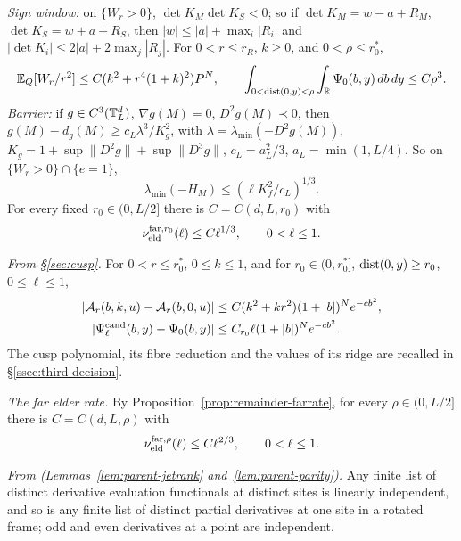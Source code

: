 \emph{Sign window:} on $\{W_r>0\}$, $\det K_M\det K_S<0$; so if $\det K_M=w-a+R_M$, $\det K_S=w+a+R_S$, then $|w|\le|a|+\max_i|R_i|$ and $|\det K_i|\le2|a|+2\max_j|R_j|$. For $0<r\le r_R$, $k\ge0$, and $0<\rho\le r_0^*$,
\begin{equation}\label{eq:third-W1}
\mathbb E_Q[W_r/r^2]\le C(k^2+r^4(1+k)^2)P^N,\qquad \int_{0<\operatorname{dist}(0,y)<\rho}\int_\mathbb R\Psi_0(b,y)\,db\,dy\le C\rho^3.
\end{equation}
\emph{Barrier:} if $g\in C^3(\mathbb T^d_L)$, $\nabla g(M)=0$, $D^2g(M)\prec0$, then $g(M)-d_g(M)\ge c_L\lambda^3/K_g^2$, with $\lambda=\lambda_{\min}(-D^2g(M))$, $K_g=1+\sup\|D^2g\|+\sup\|D^3g\|$, $c_L=a_L^2/3$, $a_L=\min(1,L/4)$. So on $\{W_r>0\}\cap\{e=1\}$,
\begin{equation}\label{eq:third-barrier}
\lambda_{\min}(-H_M)\le(\ell K_f^2/c_L)^{1/3}.
\end{equation}
For every fixed $r_0\in(0,L/2]$ there is $C=C(d,L,r_0)$ with
\begin{equation}\label{eq:third-Fprime}
\nu_{\mathrm{eld}}^{{\rm far},r_0}(\ell)\le C\ell^{1/3},\qquad 0<\ell\le1.
\end{equation}

\emph{From \S\ref{sec:cusp}.} For $0<r\le r_0^*$, $0\le k\le1$, and for $r_0\in(0,r_0^*]$, $\operatorname{dist}(0,y)\ge r_0$, $0\le\ell\le1$,
\begin{equation}\label{eq:third-gapLip}
\begin{aligned}
|\mathcal A_r(b,k,u)-\mathcal A_r(b,0,u)|&\le C(k^2+kr^2)(1+|b|)^Ne^{-cb^2},\\
|\Psi^{\mathrm{cand}}_\ell(b,y)-\Psi_0(b,y)|&\le C_{r_0}\ell(1+|b|)^Ne^{-cb^2}.
\end{aligned}
\end{equation}
The cusp polynomial, its fibre reduction and the values of its ridge are recalled in \S\ref{ssec:third-decision}.

\emph{The far elder rate.} By Proposition~\ref{prop:remainder-farrate}, for every $\rho\in(0,L/2]$ there is $C=C(d,L,\rho)$ with
\begin{equation}\label{eq:third-farrate}
\nu_{\mathrm{eld}}^{{\rm far},\rho}(\ell)\le C\ell^{2/3},\qquad 0<\ell\le1.
\end{equation}

\emph{From \cite{parentP} (Lemmas~\ref{lem:parent-jetrank} and~\ref{lem:parent-parity}).} Any finite list of distinct derivative evaluation functionals at distinct sites is linearly independent, and so is any finite list of distinct partial derivatives at one site in a rotated frame; odd and even derivatives at a point are independent.

